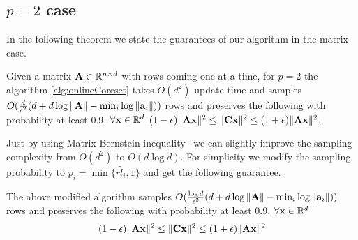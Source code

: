 \subsection{$p=2$ case}{\label{app:matrix}}
In the following theorem we state the guarantees of our algorithm in the matrix case. 
\begin{corollary}
\label{lem:matrixcoreset}
 Given a matrix $\mathbf{A} \in \mathbb{R}^{n\times d}$ with rows coming one at a time, for $p=2$ the algorithm \ref{alg:onlineCoreset} takes $O(d^{2})$ update time and samples $O(\frac{d}{\epsilon^{2}}(d+d\log\|\mathbf{A}\|-\min_{i}\log \|\mathbf{a}_{i}\|))$ rows and preserves the following with probability at least 0.9, $\forall \mathbf{x} \in \mathbb{R}^{d}$
 $(1-\epsilon)\|\mathbf{A}\mathbf{x}\|^{2} \leq \|\mathbf{C}\mathbf{x}\|^{2} \leq (1+\epsilon)\|\mathbf{A}\mathbf{x}\|^{2}$.
\end{corollary}
% 
Just by using Matrix Bernstein inequality~\cite{tropp2011freedman} we can slightly improve the sampling complexity from $O(d^{2})$ to $O(d\log d)$. For simplicity we modify the sampling probability to $p_{i} = \min\{r\tilde{l}_{i},1\}$ and get the following guarantee.
\begin{theorem}{\label{thm:improvedMatrixCoreset}}
 The above modified algorithm samples $O(\frac{\log d}{\epsilon^{2}}(d+d\log\|\mathbf{A}\|-\min_{i} \log \|\mathbf{a}_{i}\|))$ rows and preserves the following with probability at least 0.9, $\forall \mathbf{x} \in \mathbb{R}^{d}$
 \begin{align*}
  (1-\epsilon)\|\mathbf{A}\mathbf{x}\|^{2} \leq \|\mathbf{C}\mathbf{x}\|^{2} \leq (1+\epsilon)\|\mathbf{A}\mathbf{x}\|^{2}
 \end{align*}
\end{theorem}
